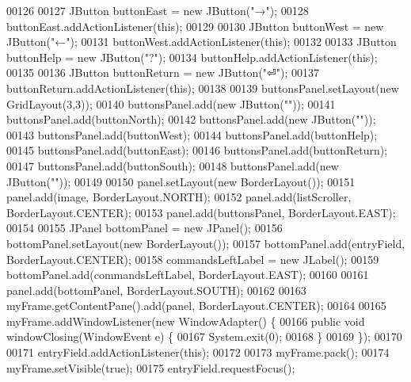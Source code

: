 \begin{DoxyCode}
00126 
00127         JButton buttonEast = \textcolor{keyword}{new} JButton(\textcolor{stringliteral}{"→"});
00128         buttonEast.addActionListener(\textcolor{keyword}{this});
00129 
00130         JButton buttonWest = \textcolor{keyword}{new} JButton(\textcolor{stringliteral}{"←"});
00131         buttonWest.addActionListener(\textcolor{keyword}{this});
00132 
00133         JButton buttonHelp = \textcolor{keyword}{new} JButton(\textcolor{stringliteral}{"?"});
00134         buttonHelp.addActionListener(\textcolor{keyword}{this});
00135 
00136         JButton buttonReturn = \textcolor{keyword}{new} JButton(\textcolor{stringliteral}{"⏎"});
00137         buttonReturn.addActionListener(\textcolor{keyword}{this});
00138 
00139         buttonsPanel.setLayout(\textcolor{keyword}{new} GridLayout(3,3));
00140         buttonsPanel.add(\textcolor{keyword}{new} JButton(\textcolor{stringliteral}{""}));
00141         buttonsPanel.add(buttonNorth);
00142         buttonsPanel.add(\textcolor{keyword}{new} JButton(\textcolor{stringliteral}{""}));
00143         buttonsPanel.add(buttonWest);
00144         buttonsPanel.add(buttonHelp);
00145         buttonsPanel.add(buttonEast);
00146         buttonsPanel.add(buttonReturn);
00147         buttonsPanel.add(buttonSouth);
00148         buttonsPanel.add(\textcolor{keyword}{new} JButton(\textcolor{stringliteral}{""}));
00149 
00150         panel.setLayout(\textcolor{keyword}{new} BorderLayout());
00151         panel.add(image, BorderLayout.NORTH);
00152         panel.add(listScroller, BorderLayout.CENTER);
00153         panel.add(buttonsPanel, BorderLayout.EAST);
00154 
00155         JPanel bottomPanel = \textcolor{keyword}{new} JPanel();
00156         bottomPanel.setLayout(\textcolor{keyword}{new} BorderLayout());
00157         bottomPanel.add(entryField, BorderLayout.CENTER);
00158         commandsLeftLabel = \textcolor{keyword}{new} JLabel();
00159         bottomPanel.add(commandsLeftLabel, BorderLayout.EAST);
00160 
00161         panel.add(bottomPanel, BorderLayout.SOUTH);
00162 
00163         myFrame.getContentPane().add(panel, BorderLayout.CENTER);
00164 
00165         myFrame.addWindowListener(\textcolor{keyword}{new} WindowAdapter() \{
00166             \textcolor{keyword}{public} \textcolor{keywordtype}{void} windowClosing(WindowEvent e) \{
00167                 System.exit(0);
00168             \}
00169         \});
00170 
00171         entryField.addActionListener(\textcolor{keyword}{this});
00172 
00173         myFrame.pack();
00174         myFrame.setVisible(\textcolor{keyword}{true});
00175         entryField.requestFocus();

\end{DoxyCode}
